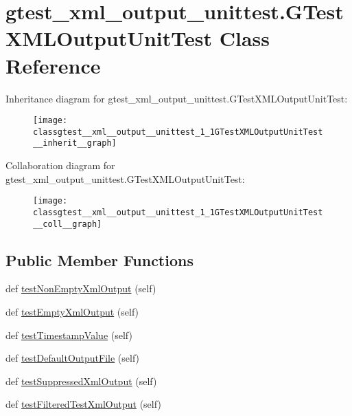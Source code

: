 \hypertarget{classgtest__xml__output__unittest_1_1GTestXMLOutputUnitTest}{}\section{gtest\+\_\+xml\+\_\+output\+\_\+unittest.\+G\+Test\+X\+M\+L\+Output\+Unit\+Test Class Reference}
\label{classgtest__xml__output__unittest_1_1GTestXMLOutputUnitTest}


Inheritance diagram for gtest\+\_\+xml\+\_\+output\+\_\+unittest.\+G\+Test\+X\+M\+L\+Output\+Unit\+Test\+:
\nopagebreak
\begin{figure}[H]
\begin{center}
\leavevmode
\texttt{[image: classgtest\_\_xml\_\_output\_\_unittest\_1\_1GTestXMLOutputUnitTest\_\_inherit\_\_graph]}
\end{center}
\end{figure}


Collaboration diagram for gtest\+\_\+xml\+\_\+output\+\_\+unittest.\+G\+Test\+X\+M\+L\+Output\+Unit\+Test\+:
\nopagebreak
\begin{figure}[H]
\begin{center}
\leavevmode
\texttt{[image: classgtest\_\_xml\_\_output\_\_unittest\_1\_1GTestXMLOutputUnitTest\_\_coll\_\_graph]}
\end{center}
\end{figure}
\subsection*{Public Member Functions}
\begin{DoxyCompactItemize}
\item 
def \hyperlink{classgtest__xml__output__unittest_1_1GTestXMLOutputUnitTest_a310c136c1eb2b421f57651a7d358b17a}{test\+Non\+Empty\+Xml\+Output} (self)
\item 
def \hyperlink{classgtest__xml__output__unittest_1_1GTestXMLOutputUnitTest_a9602f91fe2e9d1e09171a032e94a5619}{test\+Empty\+Xml\+Output} (self)
\item 
def \hyperlink{classgtest__xml__output__unittest_1_1GTestXMLOutputUnitTest_a828521a7ae57f650e1e9ca4beb34336a}{test\+Timestamp\+Value} (self)
\item 
def \hyperlink{classgtest__xml__output__unittest_1_1GTestXMLOutputUnitTest_a01ca66e14468028e5c4eb809987113cf}{test\+Default\+Output\+File} (self)
\item 
def \hyperlink{classgtest__xml__output__unittest_1_1GTestXMLOutputUnitTest_ac6df46d6831892e4c14dbdfae0049618}{test\+Suppressed\+Xml\+Output} (self)
\item 
def \hyperlink{classgtest__xml__output__unittest_1_1GTestXMLOutputUnitTest_a572b6d49e8f4d646ebdadcced3d260ef}{test\+Filtered\+Test\+Xml\+Output} (self)
\end{DoxyCompactItemize}
